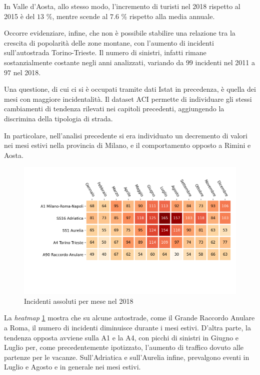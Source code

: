 \documentclass[a4paper]{report}
\newcommand{\quotestyle}[1]{\textit{#1}}
\begin{document}
In Valle d'Aosta, allo stesso modo, l'incremento di turisti nel 2018 
rispetto al 2015 è del $13$ \%, mentre scende al $7.6$ \% rispetto alla media annuale. 

Occorre evidenziare, infine, che non è possibile stabilire una relazione 
tra la crescita di popolarità delle zone montane, 
con l'aumento di incidenti sull'autostrada Torino-Trieste. 
Il numero di sinistri, infatti rimane sostanzialmente costante negli anni analizzati, 
variando da $99$ incidenti nel 2011 a $97$ nel 2018. 



Una questione, di cui ci si è occupati tramite dati Istat in precedenza, è 
quella dei mesi con maggiore incidentalità. 
Il dataset ACI permette di individuare gli stessi cambiamenti di tendenza rilevati nei 
capitoli precedenti, aggiungendo la discrimina della tipologia di strada. 

In particolare, nell'analisi precedente si era individuato un decremento di valori 
nei mesi estivi nella provincia di Milano, e il comportamento opposto a 
Rimini e Aosta. 

\begin{figure}
    \includegraphics[width=\linewidth]{../src/incidenti/incidenti_aci/autostrade/mesi_autostrade.png}
    \caption{Incidenti assoluti per mese nel 2018}
    \label{fig:incidenti-per-mese}
\end{figure}

La \quotestyle{heatmap} \ref{fig:incidenti-per-mese} mostra che su alcune autostrade, come il 
Grande Raccordo Anulare a Roma, il numero di incidenti diminuisce durante i mesi 
estivi. 
D'altra parte, la tendenza opposta avviene sulla A1 e la A4, 
con picchi di sinistri in Giugno e Luglio per, come precedentemente ipotizzato, 
l'aumento di traffico dovuto alle partenze per le vacanze. 
Sull'Adriatica e sull'Aurelia infine, prevalgono eventi 
in Luglio e Agosto e in generale nei mesi estivi. 
\end{document}
